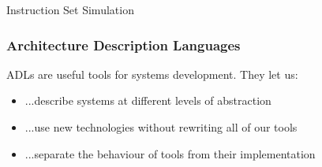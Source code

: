 \begin{frame}[t]{Instruction Set Simulation}

\end{frame}

\begin{frame}
\frametitle{Architecture Description Languages}

ADLs are useful tools for systems development. They let us:
\begin{itemize}
	\item<2-> ...describe systems at different levels of abstraction
	\item<3-> ...use new technologies without rewriting all of our tools
	\item<4-> ...separate the behaviour of tools from their implementation
\end{itemize}

\end{frame}

